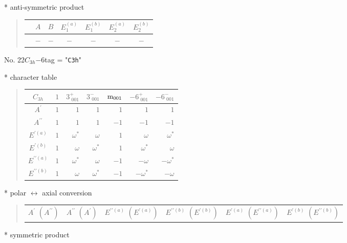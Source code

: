 \documentclass[fleqn,10pt,landscape]{jsarticle}
\begin{document}
* anti-symmetric product
\begin{quote}
\begin{tabular}{ccccccc} \hline \hline
 & $ A $ & $ B $ & $ E_{1}^{(a)} $ & $ E_{1}^{(b)} $ & $ E_{2}^{(a)} $ & $ E_{2}^{(b)} $ \\ \hline
$  $ & $ - $ & $ - $ & $ - $ & $ - $ & $ - $ & $ - $ \\
 \hline \hline
\end{tabular}
\end{quote}
\newpage
No. 22\quad$C_{3h}$\quad$-6$\quad[ hexagonal ]
tag = "{\tt C3h}"

* character table
\begin{quote}
\begin{tabular}{crrrrrr} \hline \hline
$ C_{3h} $ & $ 1 $ & $ 3^{+}_{\,\,001} $ & $ 3^{-}_{\,\,001} $ & $ {\rm m}_{001} $ & $ -6^{+}_{\,\,001} $ & $ -6^{-}_{\,\,001} $ \\ \hline
$ A^{\prime} $ & $ 1 $ & $ 1 $ & $ 1 $ & $ 1 $ & $ 1 $ & $ 1 $ \\
$ A^{\prime\prime} $ & $ 1 $ & $ 1 $ & $ 1 $ & $ -1 $ & $ -1 $ & $ -1 $ \\
$ E^{\prime(a)} $ & $ 1 $ & $ \omega^{*} $ & $ \omega $ & $ 1 $ & $ \omega $ & $ \omega^{*} $ \\
$ E^{\prime(b)} $ & $ 1 $ & $ \omega $ & $ \omega^{*} $ & $ 1 $ & $ \omega^{*} $ & $ \omega $ \\
$ E^{\prime\prime(a)} $ & $ 1 $ & $ \omega^{*} $ & $ \omega $ & $ -1 $ & $ - \omega $ & $ - \omega^{*} $ \\
$ E^{\prime\prime(b)} $ & $ 1 $ & $ \omega $ & $ \omega^{*} $ & $ -1 $ & $ - \omega^{*} $ & $ - \omega $ \\
 \hline \hline
\end{tabular}
\end{quote}
* polar $\leftrightarrow$ axial conversion
\begin{quote}
\begin{tabular}{cccccc}
$ A^{\prime}\,\,(A^{\prime\prime}) $ & $ A^{\prime\prime}\,\,(A^{\prime}) $ & $ E^{\prime\prime(a)}\,\,(E^{\prime(a)}) $ & $ E^{\prime\prime(b)}\,\,(E^{\prime(b)}) $ & $ E^{\prime(a)}\,\,(E^{\prime\prime(a)}) $ & $ E^{\prime(b)}\,\,(E^{\prime\prime(b)}) $
\end{tabular}
\end{quote}
* symmetric product
\end{document}
